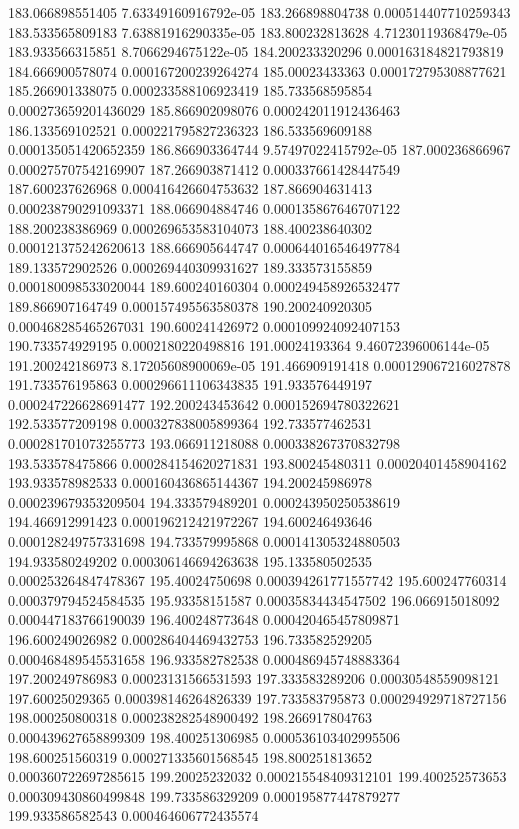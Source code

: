 {183.066898551405 7.63349160916792e-05
183.266898804738 0.000514407710259343
183.533565809183 7.63881916290335e-05
183.800232813628 4.71230119368479e-05
183.933566315851 8.7066294675122e-05
184.200233320296 0.000163184821793819
184.666900578074 0.000167200239264274
185.00023433363 0.000172795308877621
185.266901338075 0.000233588106923419
185.733568595854 0.000273659201436029
185.866902098076 0.000242011912436463
186.133569102521 0.000221795827236323
186.533569609188 0.000135051420652359
186.866903364744 9.57497022415792e-05
187.000236866967 0.000275707542169907
187.266903871412 0.000337661428447549
187.600237626968 0.000416426604753632
187.866904631413 0.000238790291093371
188.066904884746 0.000135867646707122
188.200238386969 0.000269653583104073
188.400238640302 0.000121375242620613
188.666905644747 0.000644016546497784
189.133572902526 0.000269440309931627
189.333573155859 0.000180098533020044
189.600240160304 0.000249458926532477
189.866907164749 0.000157495563580378
190.200240920305 0.000468285465267031
190.600241426972 0.000109924092407153
190.733574929195 0.0002180220498816
191.00024193364 9.46072396006144e-05
191.200242186973 8.17205608900069e-05
191.466909191418 0.000129067216027878
191.733576195863 0.000296611106343835
191.933576449197 0.000247226628691477
192.200243453642 0.000152694780322621
192.533577209198 0.000327838005899364
192.733577462531 0.000281701073255773
193.066911218088 0.000338267370832798
193.533578475866 0.000284154620271831
193.800245480311 0.00020401458904162
193.933578982533 0.000160436865144367
194.200245986978 0.000239679353209504
194.333579489201 0.000243950250538619
194.466912991423 0.000196212421972267
194.600246493646 0.000128249757331698
194.733579995868 0.000141305324880503
194.933580249202 0.000306146694263638
195.133580502535 0.000253264847478367
195.40024750698 0.000394261771557742
195.600247760314 0.000379794524584535
195.93358151587 0.00035834434547502
196.066915018092 0.000447183766190039
196.400248773648 0.000420465457809871
196.600249026982 0.000286404469432753
196.733582529205 0.000468489545531658
196.933582782538 0.000486945748883364
197.200249786983 0.00023131566531593
197.333583289206 0.00030548559098121
197.60025029365 0.000398146264826339
197.733583795873 0.000294929718727156
198.000250800318 0.000238282548900492
198.266917804763 0.000439627658899309
198.400251306985 0.000536103402995506
198.600251560319 0.000271335601568545
198.800251813652 0.000360722697285615
199.20025232032 0.000215548409312101
199.400252573653 0.000309430860499848
199.733586329209 0.000195877447879277
199.933586582543 0.000464606772435574
}
